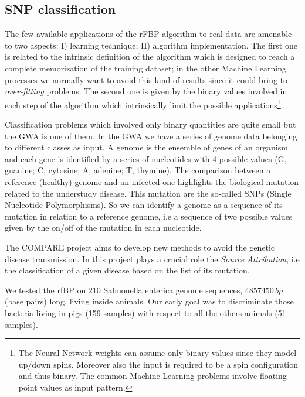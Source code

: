 \documentclass{standalone}
\begin{document}
\subsection[Compare dataset]{SNP classification}\label{rfbp:snp}

The few available applications of the rFBP algorithm to real data are amenable to two aspects: I) learning technique; II) algorithm implementation.
The first one is related to the intrinsic definition of the algorithm which is designed to reach a complete memorization of the training dataset; in the other Machine Learning processes we normally want to avoid this kind of results since it could bring to \emph{over-fitting} problems.
The second one is given by the binary values involved in each step of the algorithm which intrinsically limit the possible applications\footnote{
  The Neural Network weights can assume only binary values since they model up/down spins.
  Moreover also the input is required to be a spin configuration and thus binary.
  The common Machine Learning problems involve floating-point values as input pattern.
}.


Classification problems which involved only binary quantities are quite small but the GWA is one of them.
In the GWA we have a series of genome data belonging to different classes as input.
A genome is the ensemble of genes of an organism and each gene is identified by a series of nucleotides with 4 possible values (G, guanine; C, cytosine; A, adenine; T, thymine).
The comparison between a reference (healthy) genome and an infected one highlights the biological mutation related to the understudy disease.
This mutation are the so-called SNPs (Single Nucleotide Polymorphisms).
So we can identify a genome as a sequence of its mutation in relation to a reference genome, i.e a sequence of two possible values given by the on/off of the mutation in each nucleotide.

The COMPARE project aims to develop new methods to avoid the genetic disease transmission.
In this project plays a crucial role the \emph{Source Attribution}, i.e the classification of a given disease based on the list of its mutation.

We tested the rfBP on $210$ Salmonella enterica genome sequences, $4857450\,bp$ (base pairs) long, living inside animals.
Our early goal was to discriminate those bacteria living in pigs (159 samples) with respect to all the others animals (51 samples).
\end{document}
